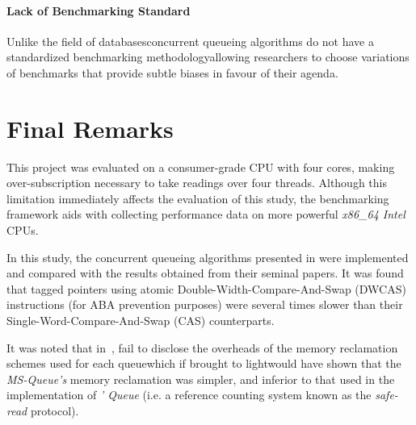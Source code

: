 \paragraph{Lack of Benchmarking Standard} Unlike the field of
databases\textemdash concurrent queueing algorithms do not have a standardized
benchmarking methodology\textemdash allowing researchers to choose variations
of benchmarks that provide subtle biases in favour of their agenda. 

\section{Final Remarks}
This project was evaluated on a consumer-grade CPU with four cores, making
over-subscription necessary to take readings over four threads. Although this
limitation immediately affects the evaluation of this study, the benchmarking
framework aids with collecting performance data on more powerful \emph{x86\_64
Intel} CPUs.

In this study, the concurrent queueing algorithms presented in
\citep{hoffman2007baskets,valois1995datastructures,michael1996simple} were
implemented and compared with the results obtained from their seminal papers.
It was found that tagged pointers using atomic Double-Width-Compare-And-Swap (DWCAS)
instructions (for ABA prevention purposes) were several times slower than
their Single-Word-Compare-And-Swap (CAS) counterparts.

It was noted that in~\citep{michael1996simple}, \citeauthor{michael1996simple}
fail to disclose the overheads of the memory reclamation schemes used for each
queue\textemdash which if brought to light\textemdash would have shown that the
\emph{MS-Queue's} memory reclamation was simpler, and inferior to that used in
the implementation of \emph{\citeauthor{valois1994queues}' Queue} (i.e. a
reference counting system known as the \emph{safe-read} protocol).

